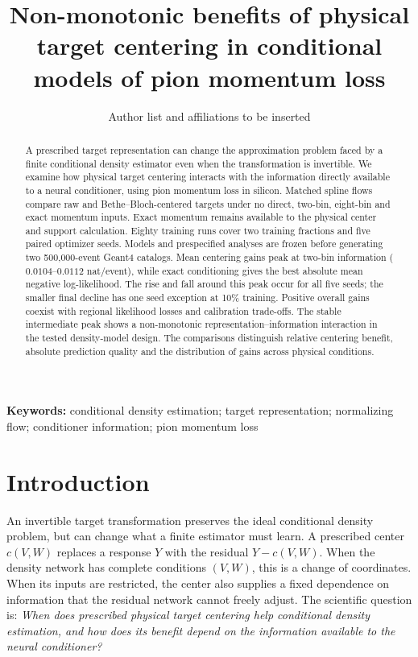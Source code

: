 \documentclass[11pt]{article}
\title{Non-monotonic benefits of physical target centering in conditional models of pion momentum loss}
\author{Author list and affiliations to be inserted}
\date{}
\begin{document}
\maketitle

\begin{abstract}
A prescribed target representation can change the approximation problem faced
by a finite conditional density estimator even when the transformation is
invertible. We examine how physical target centering interacts with the
information directly available to a neural conditioner, using pion momentum
loss in silicon. Matched spline flows compare raw and Bethe--Bloch-centered
targets under no direct, two-bin, eight-bin and exact momentum inputs.
Exact momentum remains available to the physical center and support
calculation. Eighty training runs cover two training fractions and five paired
optimizer seeds. Models and prespecified analyses are frozen before generating two
500,000-event Geant4 catalogs. Mean centering gains peak at two-bin information
($0.0104$--$0.0112$ nat/event), while exact conditioning gives the best absolute
mean negative log-likelihood. The rise and fall around this peak occur for all
five seeds; the smaller final decline has one seed exception at 10\% training.
Positive overall gains coexist with regional likelihood losses and calibration
trade-offs. The stable intermediate peak shows a non-monotonic representation--information
interaction in the tested density-model design. The comparisons distinguish
relative centering benefit, absolute prediction quality and the distribution
of gains across physical conditions.
\end{abstract}

\noindent\textbf{Keywords:} conditional density estimation; target representation;
normalizing flow; conditioner information; pion momentum loss

\section{Introduction}

An invertible target transformation preserves the ideal conditional density
problem, but can change what a finite estimator must learn. A prescribed
center $c(V,W)$ replaces a response $Y$ with the residual $Y-c(V,W)$.
When the density network has complete conditions $(V,W)$, this is a change of
coordinates. When its inputs are restricted, the center also supplies a fixed
dependence on information that the residual network cannot freely adjust.
The scientific question is: \emph{When does prescribed physical target centering
help conditional density estimation, and how does its benefit depend on the
information available to the neural conditioner?}
\end{document}
